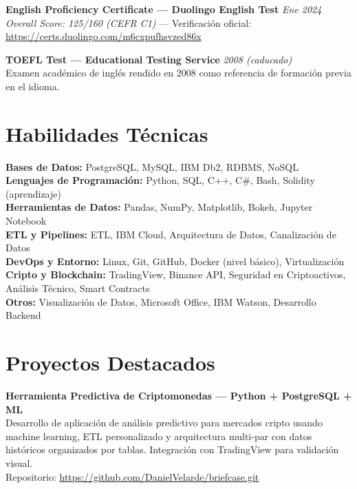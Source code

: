 \documentclass[a4paper,10pt]{article}
\begin{document}
\vspace{6pt}

\textbf{English Proficiency Certificate — Duolingo English Test} \hfill \textit{Ene 2024} \\
\textit{Overall Score: 125/160 (CEFR C1)} — Verificación oficial: \\
\url{https://certs.duolingo.com/m6cxpufhsvzed86x}

\vspace{3pt}

\textbf{TOEFL Test — Educational Testing Service} \hfill \textit{2008 (caducado)} \\
Examen académico de inglés rendido en 2008 como referencia de formación previa en el idioma.

\vspace{10pt}

\section*{Habilidades Técnicas}
\textbf{Bases de Datos:} PostgreSQL, MySQL, IBM Db2, RDBMS, NoSQL \\
\textbf{Lenguajes de Programación:} Python, SQL, C++, C\#, Bash, Solidity (aprendizaje) \\
\textbf{Herramientas de Datos:} Pandas, NumPy, Matplotlib, Bokeh, Jupyter Notebook \\
\textbf{ETL y Pipelines:} ETL, IBM Cloud, Arquitectura de Datos, Canalización de Datos \\
\textbf{DevOps y Entorno:} Linux, Git, GitHub, Docker (nivel básico), Virtualización \\
\textbf{Cripto y Blockchain:} TradingView, Binance API, Seguridad en Criptoactivos, Análisis Técnico, Smart Contracts \\
\textbf{Otros:} Visualización de Datos, Microsoft Office, IBM Watson, Desarrollo Backend

\vspace{10pt}

\section*{Proyectos Destacados}
\textbf{Herramienta Predictiva de Criptomonedas — Python + PostgreSQL + ML} \\
Desarrollo de aplicación de análisis predictivo para mercados cripto usando machine learning, ETL personalizado y arquitectura multi-par con datos históricos organizados por tablas. Integración con TradingView para validación visual. \\
Repositorio: \url{https://github.com/DanielVelarde/briefcase.git}
\end{document}
